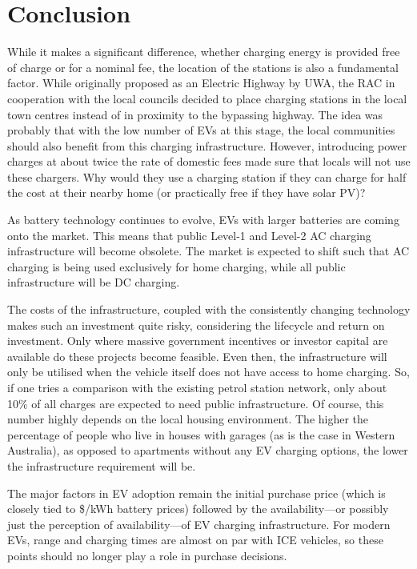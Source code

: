 \section{Conclusion}
\label{sec:10:conclu}
While it makes a significant difference, whether charging energy is provided free of charge or for a nominal fee, the location of the stations is also a fundamental factor. While originally proposed as an Electric Highway by UWA, the RAC in cooperation with the local councils decided to place charging stations in the local town centres instead of in proximity to the bypassing highway. The idea was probably that with the low number of EVs at this stage, the local communities should also benefit from this charging infrastructure. However, introducing power charges at about twice the rate of domestic fees made sure that locals will not use these chargers. Why would they use a charging station if they can charge for half the cost at their nearby home (or practically free if they have solar PV)?

As battery technology continues to evolve, EVs with larger batteries are coming onto the market. This means that public Level-1 and Level-2 AC charging infrastructure will become obsolete. The market is expected to shift such that AC charging is being used exclusively for home charging, while all public infrastructure will be DC charging.

The costs of the infrastructure, coupled with the consistently changing technology makes such an investment quite risky, considering the lifecycle and return on investment. Only where massive government incentives or investor capital are available do these projects become feasible. Even then, the infrastructure will only be utilised when the vehicle itself does not have access to home charging. So, if one tries a comparison with the existing petrol station network, only about 10\% of all charges are expected to need public infrastructure. Of course, this number highly depends on the local housing environment. The higher the percentage of people who live in houses with garages (as is the case in Western Australia), as opposed to apartments without any EV charging options, the lower the infrastructure requirement will be.

The major factors in EV adoption remain the initial purchase price (which is closely tied to \$/kWh battery prices) followed by the availability---or possibly just the perception of availability---of EV charging infrastructure. For modern EVs, range and charging times are almost on par with ICE vehicles, so these points should no longer play a role in purchase decisions.

